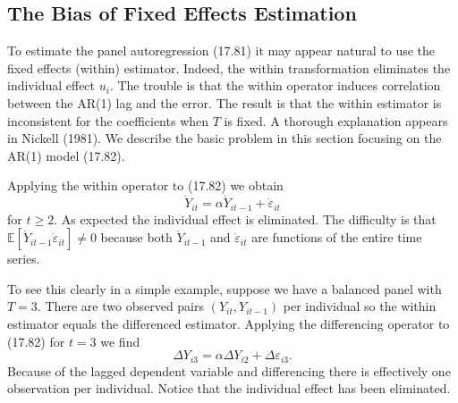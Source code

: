 \documentclass[10pt]{article}
\begin{document}
\subsection{The Bias of Fixed Effects Estimation}
To estimate the panel autoregression (17.81) it may appear natural to use the fixed effects (within) estimator. Indeed, the within transformation eliminates the individual effect $u_{i}$. The trouble is that the within operator induces correlation between the AR(1) lag and the error. The result is that the within estimator is inconsistent for the coefficients when $T$ is fixed. A thorough explanation appears in Nickell (1981). We describe the basic problem in this section focusing on the AR(1) model (17.82).

Applying the within operator to (17.82) we obtain
$$
\dot{Y}_{i t}=\alpha \dot{Y}_{i t-1}+\dot{\varepsilon}_{i t}
$$
for $t \geq 2$. As expected the individual effect is eliminated. The difficulty is that $\mathbb{E}\left[\dot{Y}_{i t-1} \dot{\varepsilon}_{i t}\right] \neq 0$ because both $\dot{Y}_{i t-1}$ and $\dot{\varepsilon}_{i t}$ are functions of the entire time series.

To see this clearly in a simple example, suppose we have a balanced panel with $T=3$. There are two observed pairs $\left(Y_{i t}, Y_{i t-1}\right)$ per individual so the within estimator equals the differenced estimator. Applying the differencing operator to (17.82) for $t=3$ we find
$$
\Delta Y_{i 3}=\alpha \Delta Y_{i 2}+\Delta \varepsilon_{i 3} .
$$
Because of the lagged dependent variable and differencing there is effectively one observation per individual. Notice that the individual effect has been eliminated.
\end{document}
